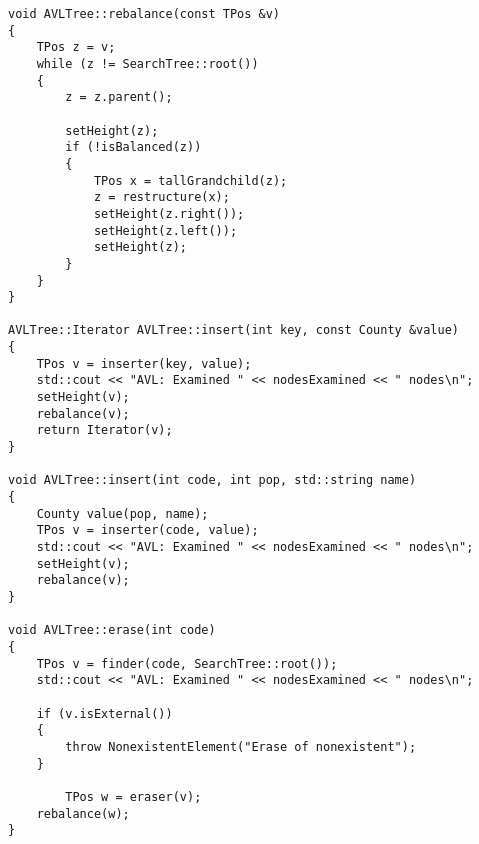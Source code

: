\documentclass{article}
\begin{document}
\begin{verbatim}
void AVLTree::rebalance(const TPos &v)
{
    TPos z = v;
    while (z != SearchTree::root())
    {
        z = z.parent();

        setHeight(z);
        if (!isBalanced(z))
        {
            TPos x = tallGrandchild(z);
            z = restructure(x);
            setHeight(z.right());
            setHeight(z.left());
            setHeight(z);
        }
    }
}

AVLTree::Iterator AVLTree::insert(int key, const County &value)
{
    TPos v = inserter(key, value);
    std::cout << "AVL: Examined " << nodesExamined << " nodes\n";
    setHeight(v);
    rebalance(v);
    return Iterator(v);
}

void AVLTree::insert(int code, int pop, std::string name)
{
    County value(pop, name);
    TPos v = inserter(code, value);
    std::cout << "AVL: Examined " << nodesExamined << " nodes\n";
    setHeight(v);
    rebalance(v);
}

void AVLTree::erase(int code)
{
    TPos v = finder(code, SearchTree::root());
    std::cout << "AVL: Examined " << nodesExamined << " nodes\n";

    if (v.isExternal())
    {
        throw NonexistentElement("Erase of nonexistent");
    }

        TPos w = eraser(v);
    rebalance(w);
}
    \end{verbatim}
\end{document}
